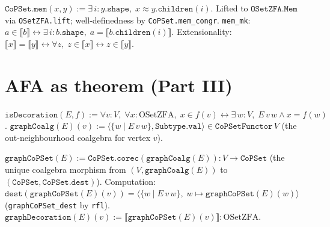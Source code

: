 \begin{definition}
\label{def:OSetZFA_mem}
\leanok
{}
$\texttt{CoPSet.mem}(x, y) := \exists\, i : y.\texttt{shape},\;
x \approx y.\texttt{children}(i)$.
Lifted to $\texttt{OSetZFA.Mem}$ via \texttt{OSetZFA.lift}; well-definedness by
\texttt{CoPSet.mem\_congr}.
\texttt{mem\_mk}: $a \in \llbracket b \rrbracket \leftrightarrow
\exists\, i : b.\texttt{shape},\; a = \llbracket b.\texttt{children}(i) \rrbracket$.
Extensionality: $\llbracket x \rrbracket = \llbracket y \rrbracket \leftrightarrow
\forall z,\; z \in \llbracket x \rrbracket \leftrightarrow z \in \llbracket y \rrbracket$.
\end{definition}

\section{AFA as theorem (Part III)}
\label{sec:setszfa_afa}

\begin{definition}
\label{def:isDecoration}
\leanok
{}
$\texttt{isDecoration}(E, f) :=
\forall v : V,\; \forall x : \mathrm{OSetZFA},\;
x \in f(v) \leftrightarrow \exists\, w : V,\; E\,v\,w \land x = f(w)$.
$\texttt{graphCoalg}(E)(v) := \langle\{w \mid E\,v\,w\},
\texttt{Subtype.val}\rangle \in \texttt{CoPSetFunctor}\,V$
(the out-neighbourhood coalgebra for vertex $v$).
\end{definition}

\begin{definition}
\label{def:graphDecoration}
\leanok
{}
$\texttt{graphCoPSet}(E) := \texttt{CoPSet.corec}(\texttt{graphCoalg}(E))
: V \to \texttt{CoPSet}$
(the unique coalgebra morphism from $(V, \texttt{graphCoalg}(E))$ to
$(\texttt{CoPSet}, \texttt{CoPSet.dest})$).
Computation: $\texttt{dest}(\texttt{graphCoPSet}(E)(v)) =
\langle\{w \mid E\,v\,w\},\; w \mapsto \texttt{graphCoPSet}(E)(w)\rangle$
(\texttt{graphCoPSet\_dest} by \texttt{rfl}).
$\texttt{graphDecoration}(E)(v) := \llbracket\texttt{graphCoPSet}(E)(v)\rrbracket
: \mathrm{OSetZFA}$.
\end{definition}

